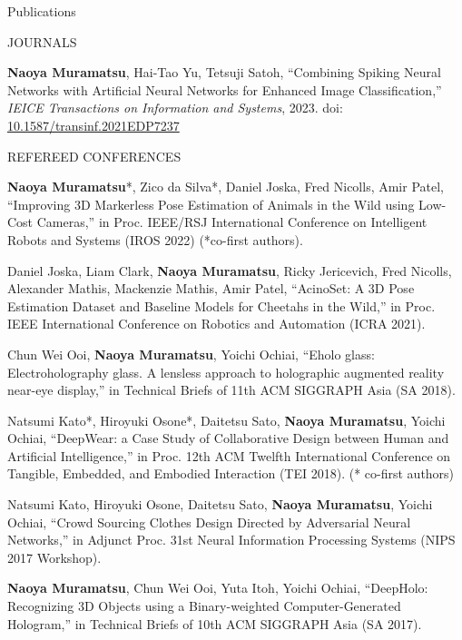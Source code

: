 \documentclass{resume} %
\begin{document}
\begin{rSection}{Publications} \itemsep 4pt

    \begin{rSubsection}{JOURNALS}{}{}{}{}
        \item \textbf{Naoya Muramatsu}, Hai-Tao Yu, Tetsuji Satoh, ``Combining Spiking Neural Networks with Artificial Neural Networks for Enhanced Image Classification,'' \textit{IEICE Transactions on Information and Systems}, 2023. doi: \url{10.1587/transinf.2021EDP7237}
    \end{rSubsection}

    \begin{rSubsection}{REFEREED CONFERENCES}{}{}{}{}
        \item \textbf{Naoya Muramatsu}*, Zico da Silva*, Daniel Joska, Fred Nicolls, Amir Patel, ``Improving 3D Markerless Pose Estimation of Animals in the Wild using Low-Cost Cameras,'' in Proc. IEEE/RSJ International Conference on Intelligent Robots and Systems (IROS 2022) (*co-first authors).
        \item Daniel Joska, Liam Clark, \textbf{Naoya Muramatsu}, Ricky Jericevich, Fred Nicolls, Alexander Mathis, Mackenzie Mathis, Amir Patel, ``AcinoSet: A 3D Pose Estimation Dataset and Baseline Models for Cheetahs in the Wild,'' in Proc. IEEE International Conference on Robotics and Automation (ICRA 2021).
        \item Chun Wei Ooi, \textbf{Naoya Muramatsu}, Yoichi Ochiai, ``Eholo glass: Electroholography glass. A lensless approach to holographic augmented reality near-eye display,'' in Technical Briefs of 11th ACM SIGGRAPH Asia (SA 2018).
        \item Natsumi Kato*, Hiroyuki Osone*, Daitetsu Sato, \textbf{Naoya Muramatsu}, Yoichi Ochiai, ``DeepWear: a Case Study of Collaborative Design between Human and Artificial Intelligence,''  in Proc. 12th ACM Twelfth International Conference on Tangible, Embedded, and Embodied Interaction (TEI 2018). (* co-first authors)
        \item Natsumi Kato, Hiroyuki Osone, Daitetsu Sato, \textbf{Naoya Muramatsu}, Yoichi Ochiai, ``Crowd Sourcing Clothes Design Directed by Adversarial Neural Networks,'' in  Adjunct Proc. 31st Neural Information Processing Systems (NIPS 2017 Workshop).
        \item \textbf{Naoya Muramatsu}, Chun Wei Ooi, Yuta Itoh, Yoichi Ochiai, ``DeepHolo: Recognizing 3D Objects using a Binary-weighted Computer-Generated Hologram,'' in Technical Briefs of 10th ACM SIGGRAPH Asia (SA 2017).

\end{rSubsection}
\end{rSection}
\end{document}
